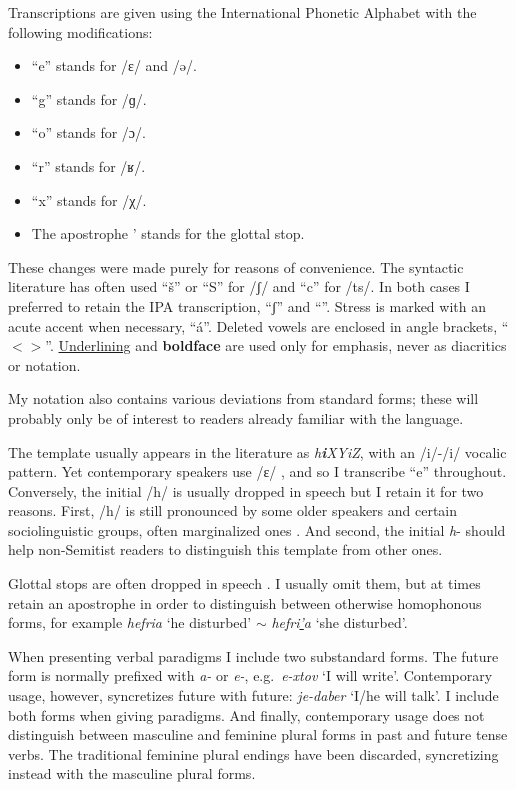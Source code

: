 \begin{exe}
\begin{xlist}
\begin{exe}
\begin{exe}
\begin{exe}
\begin{exe}
\begin{xlist}
\begin{exe}
\begin{xlist}
\begin{xlist}
\begin{xlist}
\begin{exe}
\begin{xlist}
\begin{exe}
\begin{exe}
Transcriptions are given using the International Phonetic Alphabet with the following modifications:
\begin{itemize}
	\item ``e'' stands for /ɛ/ and /ə/.
	\item ``g'' stands for /ɡ/.
	\item ``o'' stands for /ɔ/.
	\item ``r'' stands for /ʁ/.
	\item ``x'' stands for /χ/.
	\item The apostrophe ' stands for the glottal stop. %
\end{itemize}
These changes were made purely for reasons of convenience. The syntactic literature has often used ``\v{s}'' or ``S'' for /ʃ/ and ``c'' for /ts/. In both cases I preferred to retain the IPA transcription, ``ʃ'' and ``{\ts}''. Stress is marked with an acute accent when necessary, ``\'a''. Deleted vowels are enclosed in angle brackets, ``$<>$''. \underline{Underlining} and \textbf{boldface} are used only for emphasis, never as diacritics or notation.

My notation also contains various deviations from standard forms; these will probably only be of interest to readers already familiar with the language.

The template {\thif} usually appears in the literature as \emph{h\textbf{i}XYiZ}, with an /i/-/i/ vocalic pattern. Yet contemporary speakers use /ɛ/ \citep{trachtman16}, and so I transcribe ``e'' throughout. Conversely, the initial /h/ is usually dropped in speech but I retain it for two reasons. First, /h/ is still pronounced by some older speakers and certain sociolinguistic groups, often marginalized ones \citep[cf.~][]{schwarzwald81biu,gafter14phd}. And second, the initial \emph{h}- should help non-Semitist readers to distinguish this template from other ones.

Glottal stops are often dropped in speech \citep{enguehardfaust18}. I usually omit them, but at times retain an apostrophe in order to distinguish between otherwise homophonous forms, for example \emph{hefria} `he disturbed' $\sim$ \emph{hefri\underline{'}a} `she disturbed'.

When presenting verbal paradigms I include two substandard forms. The  future form is normally prefixed with \emph{a-} or \emph{e-}, e.g.~\emph{e-xtov} `I will write'. Contemporary usage, however, syncretizes  future with  future: \emph{je-daber} `I/he will talk'. I include both forms when giving paradigms. And finally, contemporary usage does not distinguish between masculine and feminine plural forms in past and future tense verbs. The traditional feminine plural endings have been discarded, syncretizing instead with the masculine plural forms.


\end{exe}
\end{exe}
\end{xlist}
\end{exe}
\end{xlist}
\end{xlist}
\end{xlist}
\end{exe}
\end{xlist}
\end{exe}
\end{exe}
\end{exe}
\end{exe}
\end{xlist}
\end{exe}
